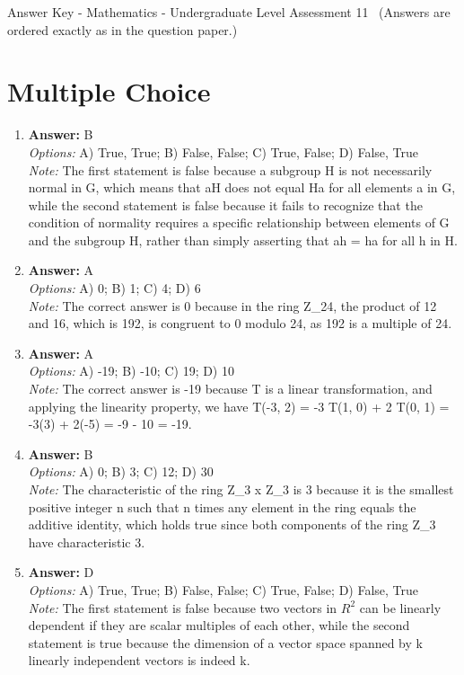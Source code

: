 \documentclass[12pt]{article}
\begin{document}
\begin{center}
Answer Key - Mathematics - Undergraduate Level Assessment 11 \
\small (Answers are ordered exactly as in the question paper.)
\end{center}

\section*{Multiple Choice}
\begin{enumerate}[label=\arabic*.]
\item \textbf{Answer:} B
\\ \textit{Options:} A) True, True; B) False, False; C) True, False; D) False, True
\\ \textit{Note:} The first statement is false because a subgroup H is not necessarily normal in G, which means that aH does not equal Ha for all elements a in G, while the second statement is false because it fails to recognize that the condition of normality requires a specific relationship between elements of G and the subgroup H, rather than simply asserting that ah = ha for all h in H.
\item \textbf{Answer:} A
\\ \textit{Options:} A) 0; B) 1; C) 4; D) 6
\\ \textit{Note:} The correct answer is 0 because in the ring Z\_24, the product of 12 and 16, which is 192, is congruent to 0 modulo 24, as 192 is a multiple of 24.
\item \textbf{Answer:} A
\\ \textit{Options:} A) -19; B) -10; C) 19; D) 10
\\ \textit{Note:} The correct answer is -19 because T is a linear transformation, and applying the linearity property, we have T(-3, 2) = -3 T(1, 0) + 2 T(0, 1) = -3(3) + 2(-5) = -9 - 10 = -19.
\item \textbf{Answer:} B
\\ \textit{Options:} A) 0; B) 3; C) 12; D) 30
\\ \textit{Note:} The characteristic of the ring Z\_3 x Z\_3 is 3 because it is the smallest positive integer n such that n times any element in the ring equals the additive identity, which holds true since both components of the ring Z\_3 have characteristic 3.
\item \textbf{Answer:} D
\\ \textit{Options:} A) True, True; B) False, False; C) True, False; D) False, True
\\ \textit{Note:} The first statement is false because two vectors in $R^2$ can be linearly dependent if they are scalar multiples of each other, while the second statement is true because the dimension of a vector space spanned by k linearly independent vectors is indeed k.
\end{enumerate}
\end{document}
